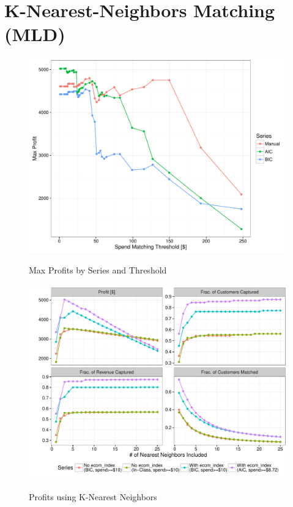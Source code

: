 \section{K-Nearest-Neighbors Matching (MLD)}





\begin{figure}[!htb]
  \centering
  \caption{Max Profits by Series and Threshold}
  \includegraphics[scale=.5]{threshold_max_profit.pdf}
  \label{fig:threshold_max_profit}
\end{figure}

\begin{figure}[!htb]
  \centering
  \caption{Profits using K-Nearest Neighbors}
  \includegraphics[scale=.75]{profits.pdf}
  \label{fig:profits}
\end{figure}


